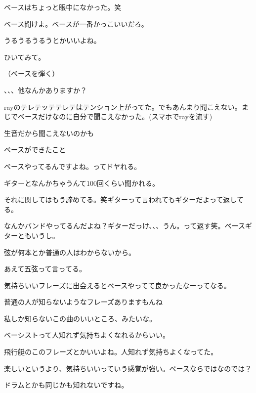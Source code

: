 \begin{multicols}{3}
ベースはちょっと眼中になかった。笑

ベース聞けよ。ベースが一番かっこいいだろ。

うるうるうるうとかいいよね。

ひいてみて。

（ベースを弾く）

、、、他なんかありますか？

rayのテレテッテテレテはテンション上がってた。でもあんまり聞こえない。まじでベースだけなのに自分で聞こえなかった。(スマホでrayを流す)

生音だから聞こえないのかも
 

\vspace{10mm}
\noindent{}

ベースができたこと

ベースやってるんですよね。ってドヤれる。

ギターとなんかちゃうんて100回くらい聞かれる。

それに関してはもう諦めてる。笑ギターって言われてもギターだよって返してる。

なんかバンドやってるんだよね？ギターだっけ、、、うん。って返す笑。ベースギターともいうし。

弦が何本とか普通の人はわからないから。

あえて五弦って言ってる。

気持ちいいフレーズに出会えるとベースやってて良かったなーってなる。

普通の人が知らないようなフレーズありますもんね

私しか知らないこの曲のいいところ、みたいな。

ベーシストって人知れず気持ちよくなれるからいい。

飛行艇のこのフレーズとかいいよね。人知れず気持ちよくなってた。

楽しいというより、気持ちいいっていう感覚が強い。ベースならではなのでは？

ドラムとかも同じかも知れないですね。


\end{multicols}
